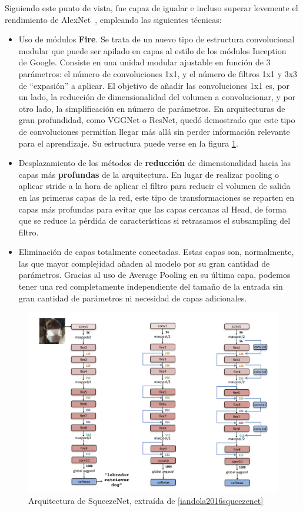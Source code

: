 Siguiendo este punto de vista, fue capaz de igualar e incluso superar levemente el rendimiento de AlexNet~\cite{NIPS2012_c399862d}, empleando las siguientes técnicas:
\begin{itemize}
    \item Uso de módulos \textbf{Fire}. Se trata de un nuevo tipo de estructura convolucional modular que puede ser apilado en capas al estilo de los módulos Inception ~\cite{szegedy2014going} de Google. Consiste en una unidad modular ajustable en función de 3 parámetros: el número de convoluciones 1x1, y el número de filtros 1x1 y 3x3 de ``expasión'' a aplicar. El objetivo de añadir las convoluciones 1x1 es, por un lado, la reducción de dimensionalidad del volumen a convolucionar, y por otro lado, la simplificación en número de parámetros. En arquitecturas de gran profundidad, como VGGNet o ResNet, quedó demostrado que este tipo de convoluciones permitían llegar más allá sin perder información relevante para el aprendizaje. Su estructura puede verse en la figura \ref{figsqueeze}.
    \item Desplazamiento de los métodos de \textbf{reducción} de dimensionalidad hacia las capas más \textbf{profundas} de la arquitectura. En lugar de realizar pooling o aplicar stride a la hora de aplicar el filtro para reducir el volumen de salida en las primeras capas de la red, este tipo de transformaciones se reparten en capas más profundas para evitar que las capas cercanas al Head, de forma que se reduce la pérdida de características si retrasamos el subsampling del filtro.
    \item Eliminación de capas totalmente conectadas. Estas capas son, normalmente, las que mayor complejidad añaden al modelo por su gran cantidad de parámetros. Gracias al uso de Average Pooling en su última capa, podemos tener una red completamente independiente del tamaño de la entrada sin gran cantidad de parámetros ni necesidad de capas adicionales.
\end{itemize}

\begin{figure}[H]
	\centering
	\includegraphics[scale = 0.2]{imagenes/squeezenet.png}
	\caption{Arquitectura de SqueezeNet, extraída de \ref{iandola2016squeezenet}}
		\label{figsqueeze}
\end{figure}


